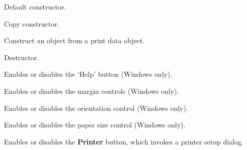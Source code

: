 
\label{wxpagesetupdialogdatactor}


Default constructor.


Copy constructor.


Construct an object from a print data object.

\label{wxpagesetupdialogdatadtor}


Destructor.

\label{wxpagesetupdialogdataenablehelp}


Enables or disables the `Help' button (Windows only).

\label{wxpagesetupdialogdataenablemargins}


Enables or disables the margin controls (Windows only).

\label{wxpagesetupdialogdataenableorientation}


Enables or disables the orientation control (Windows only).

\label{wxpagesetupdialogdataenablepaper}


Enables or disables the paper size control (Windows only).

\label{wxpagesetupdialogdataenableprinter}


Enables or disables the {\bf Printer} button, which invokes a printer setup dialog.

